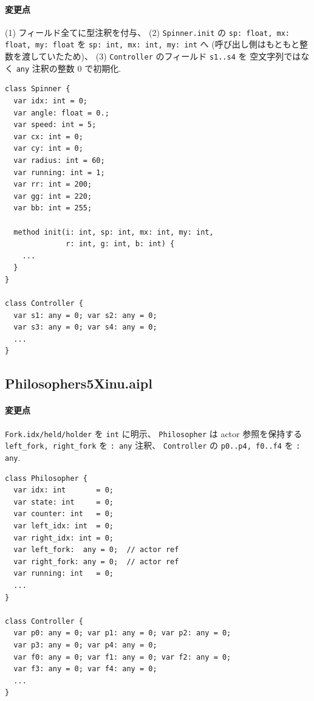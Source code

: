 \documentclass[11pt,a4paper]{article}
\begin{document}
\paragraph{変更点} (1) フィールド全てに型注釈を付与、
(2) \texttt{Spinner.init} の \texttt{sp: float, mx: float, my: float} を
\texttt{sp: int, mx: int, my: int} へ
(呼び出し側はもともと整数を渡していたため)、
(3) \texttt{Controller} のフィールド \texttt{s1..s4} を
空文字列ではなく \texttt{any} 注釈の整数 0 で初期化.

\begin{lstlisting}[language=abcl,caption={Rotate4LinesXinu.aipl 主な差分}]
class Spinner {
  var idx: int = 0;
  var angle: float = 0.;
  var speed: int = 5;
  var cx: int = 0;
  var cy: int = 0;
  var radius: int = 60;
  var running: int = 1;
  var rr: int = 200;
  var gg: int = 220;
  var bb: int = 255;

  method init(i: int, sp: int, mx: int, my: int,
              r: int, g: int, b: int) {
    ...
  }
}

class Controller {
  var s1: any = 0; var s2: any = 0;
  var s3: any = 0; var s4: any = 0;
  ...
}
\end{lstlisting}

\subsection{Philosophers5Xinu.aipl}

\paragraph{変更点}
\texttt{Fork.idx/held/holder} を \texttt{int} に明示、
\texttt{Philosopher} は actor 参照を保持する \texttt{left\_fork,
right\_fork} を \texttt{: any} 注釈、
\texttt{Controller} の \texttt{p0..p4, f0..f4} を \texttt{: any}.

\begin{lstlisting}[language=abcl,caption={Philosophers5Xinu.aipl actor 参照フィールド}]
class Philosopher {
  var idx: int       = 0;
  var state: int     = 0;
  var counter: int   = 0;
  var left_idx: int  = 0;
  var right_idx: int = 0;
  var left_fork:  any = 0;  // actor ref
  var right_fork: any = 0;  // actor ref
  var running: int   = 0;
  ...
}

class Controller {
  var p0: any = 0; var p1: any = 0; var p2: any = 0;
  var p3: any = 0; var p4: any = 0;
  var f0: any = 0; var f1: any = 0; var f2: any = 0;
  var f3: any = 0; var f4: any = 0;
  ...
}
\end{lstlisting}
\end{document}

